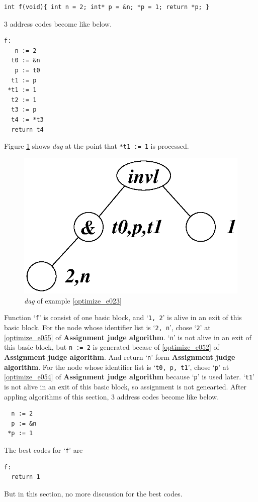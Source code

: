 \begin{Example}
\label{optimize_e023}
\begin{verbatim}
int f(void){ int n = 2; int* p = &n; *p = 1; return *p; }
\end{verbatim}
3 address codes become like below.
\begin{verbatim}
f:
   n := 2
  t0 := &n
   p := t0
  t1 := p
 *t1 := 1
  t2 := 1
  t3 := p
  t4 := *t3
  return t4
\end{verbatim}
Figure \ref{optimize_e024} shows {\em dag} at the point
that {\tt{*t1 := 1}} is processed.
\begin{figure}[htbp]
\begin{center}
\includegraphics[width=0.7\linewidth,height=0.423\linewidth]{opt010.eps}
\caption{{\em dag} of example \ref{optimize_e023}}
\label{optimize_e024}
\end{center}
\end{figure}
Function `{\tt{f}}' is consist of one basic block, and 
`{\tt{1, 2}}' is alive in an exit of this basic block.
For the node whose identifier list is `{\tt{2, n}}',
chose `{\tt{2}}' at \ref{optimize_e055} of {\bf Assignment judge algorithm}.
`{\tt{n}}' is not alive in an exit of this basic block,
but {\tt{n := 2}} is generated becase of \ref{optimize_e052}
of {\bf Assignment judge algorithm}. And return `{\tt{n}}'
form {\bf Assignment judge algorithm}.
For the node whose identifier list is `{\tt{t0, p, t1}}',
chose `{\tt{p}}' at \ref{optimize_e054} of {\bf Assignment judge
 algorithm} because `{\tt{p}}' is used later.
`{\tt{t1}}' is not alive in an exit of this basic block,
so assignment is not genearted.
After appling algorithms of this section,
3 address codes become like below.
\begin{verbatim}
  n := 2
  p := &n
 *p := 1
\end{verbatim}
The best codes for `{\tt{f}}' are
\begin{verbatim}
f:
  return 1
\end{verbatim}
But in this section, no more discussion for the best codes.
\end{Example}

